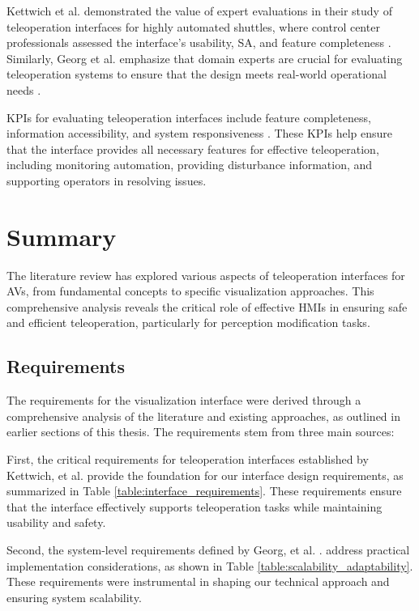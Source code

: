 Kettwich et al. demonstrated the value of expert evaluations in their study of teleoperation interfaces for highly automated shuttles, where control center professionals assessed the interface's usability, \ac{SA}, and feature completeness \cite{Kettwich}. Similarly, Georg et al. emphasize that domain experts are crucial for evaluating teleoperation systems to ensure that the design meets real-world operational needs \cite{Georg}.

\acp{KPI} for evaluating teleoperation interfaces include feature completeness, information accessibility, and system responsiveness \cite{Brecht}. These \acp{KPI} help ensure that the interface provides all necessary features for effective teleoperation, including monitoring automation, providing disturbance information, and supporting operators in resolving issues.

\section{Summary}
The literature review has explored various aspects of teleoperation interfaces for \acp{AV}, from fundamental concepts to specific visualization approaches. This comprehensive analysis reveals the critical role of effective \acp{HMI} in ensuring safe and efficient teleoperation, particularly for perception modification tasks.
\subsection{Requirements}

The requirements for the visualization interface were derived through a comprehensive analysis of the literature and existing approaches, as outlined in earlier sections of this thesis. The requirements stem from three main sources:

First, the critical requirements for teleoperation interfaces established by Kettwich, et al. \cite{Kettwich} provide the foundation for our interface design requirements, as summarized in Table \ref{table:interface_requirements}. These requirements ensure that the interface effectively supports teleoperation tasks while maintaining usability and safety.

Second, the system-level requirements defined by Georg, et al. \cite{Georg}. address practical implementation considerations, as shown in Table \ref{table:scalability_adaptability}. These requirements were instrumental in shaping our technical approach and ensuring system scalability.

